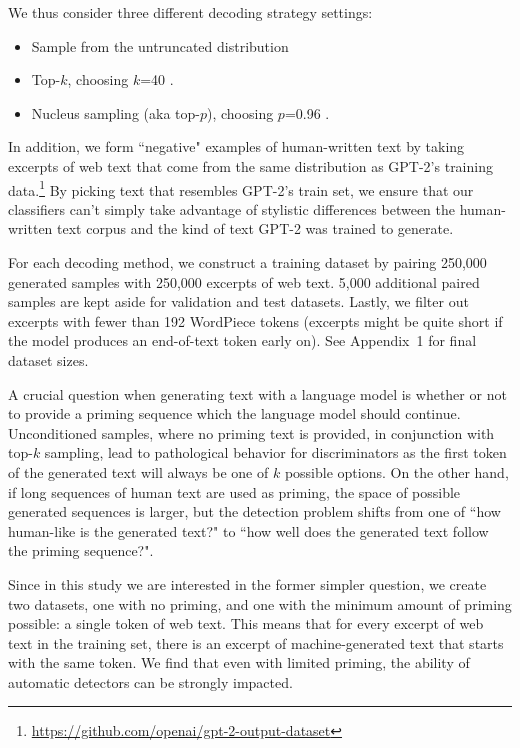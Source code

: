 We thus consider three different decoding strategy settings:
\begin{itemize}[noitemsep,topsep=0pt]
  \item Sample from the untruncated distribution
  \item Top-$k$, choosing $k$=40 \citep{radford2019language}.
  \item Nucleus sampling (aka top-$p$), choosing $p$=0.96 \citep{zellers2019defending}.
\end{itemize}

In addition, we form ``negative" examples of human-written text by taking excerpts of web text that come from the same distribution as GPT-2's training data.\footnote{\url{https://github.com/openai/gpt-2-output-dataset}}
By picking text that resembles GPT-2's train set, we ensure that our classifiers can't simply take advantage of stylistic differences between the human-written text corpus and the kind of text GPT-2 was trained to generate.

For each decoding method, we construct a training dataset by pairing 250,000 generated samples with 250,000 excerpts of web text.
5,000 additional paired samples are kept aside for validation and test datasets.
Lastly, we filter out excerpts with fewer than 192 WordPiece tokens \citep{wu2016google} (excerpts might be quite short if the model produces an end-of-text token early on). See Appendix~1 for final dataset sizes.

A crucial question when generating text with a language model is whether or not to provide a priming sequence which the language model should continue.
Unconditioned samples, where no priming text is provided, in conjunction with top-$k$ sampling, lead to pathological behavior for discriminators as the first token of the generated text will always be one of $k$ possible options.
On the other hand, if long sequences of human text are used as priming, the space of possible generated sequences is larger, but the detection problem shifts from one of ``how human-like is the generated text?" to ``how well does the generated text follow the priming sequence?".

Since in this study we are interested in the former simpler question, we create two datasets, one with no priming, and one with the minimum amount of priming possible: a single token of web text.
This means that for every excerpt of web text in the training set, there is an excerpt of machine-generated text that starts with the same token.
We find that even with limited priming, the ability of automatic detectors can be strongly impacted.

